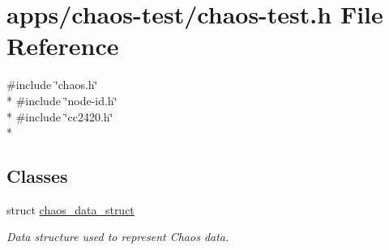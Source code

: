 \hypertarget{chaos-test_8h}{\section{apps/chaos-\/test/chaos-\/test.h File Reference}
\label{chaos-test_8h}
}
{\ttfamily \#include \char`\"{}chaos.\-h\char`\"{}}\\*
{\ttfamily \#include \char`\"{}node-\/id.\-h\char`\"{}}\\*
{\ttfamily \#include \char`\"{}cc2420.\-h\char`\"{}}\\*
\subsection*{Classes}
\begin{DoxyCompactItemize}
\item 
struct \hyperlink{structchaos__data__struct}{chaos\-\_\-data\-\_\-struct}
\begin{DoxyCompactList}\small\item\em Data structure used to represent Chaos data. \end{DoxyCompactList}\end{DoxyCompactItemize}
